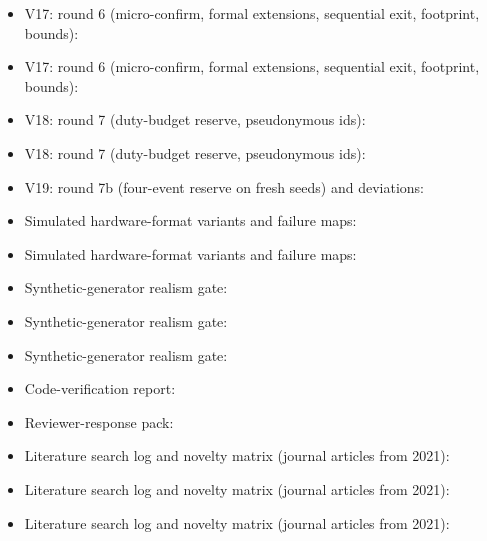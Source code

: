 \documentclass[10pt,a4paper]{article}
\begin{document}
{\begin{itemize}
\item V17: round 6 (micro-confirm, formal extensions, sequential exit, footprint, bounds): 
\item V17: round 6 (micro-confirm, formal extensions, sequential exit, footprint, bounds): 
\item V18: round 7 (duty-budget reserve, pseudonymous ids): 
\item V18: round 7 (duty-budget reserve, pseudonymous ids): 
\item V19: round 7b (four-event reserve on fresh seeds) and deviations: 
\item Simulated hardware-format variants and failure maps: 
\item Simulated hardware-format variants and failure maps: 
\item Synthetic-generator realism gate: 
\item Synthetic-generator realism gate: 
\item Synthetic-generator realism gate: 
\item Code-verification report: 
\item Reviewer-response pack: 
\item Literature search log and novelty matrix (journal articles from 2021): 
\item Literature search log and novelty matrix (journal articles from 2021): 
\item Literature search log and novelty matrix (journal articles from 2021): 
\end{itemize}}
\end{document}
